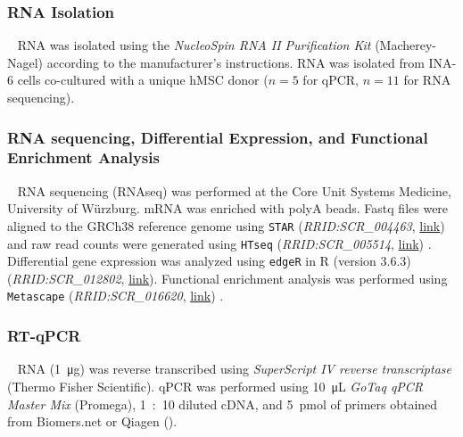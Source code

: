 \subsubsection*{RNA Isolation}
\ %
RNA was isolated using the \textit{NucleoSpin RNA II Purification Kit}
(Macherey-Nagel) according to the manufacturer's instructions. RNA was isolated
from INA-6 cells co-cultured with a unique hMSC donor ($n=5$ for qPCR, $n=11$
for RNA sequencing).

\subsubsection*{RNA sequencing, Differential Expression, and Functional Enrichment Analysis}
\ %
RNA sequencing (RNAseq) was performed at the Core Unit Systems Medicine,
University of Würzburg. mRNA was enriched with polyA beads. Fastq files were
aligned to the GRCh38 reference genome using \texttt{STAR}
(\textit{RRID:SCR\_004463},
\href{https://scicrunch.org/resolver/RRID:SCR_004463}{link}) and raw read
counts were generated using \texttt{HTseq} (\textit{RRID:SCR\_005514},
\href{https://scicrunch.org/resolver/SCR_005514}{link})
\cite{andersHTSeqPythonFramework2015,dobinSTARUltrafastUniversal2013,zerbinoEnsembl20182018}.
Differential gene expression was analyzed using \texttt{edgeR} in R (version
3.6.3) (\textit{RRID:SCR\_012802},
\href{https://scicrunch.org/resolver/SCR_012802}{link}). Functional
enrichment analysis was performed using \texttt{Metascape}
(\textit{RRID:SCR\_016620},
\href{https://scicrunch.org/resolver/SCR_016620}{link})
\cite{zhouMetascapeProvidesBiologistoriented2019}.


\subsubsection*{RT-qPCR}
\ %
RNA (\SI{1}{\micro\gram}) was reverse transcribed using \textit{SuperScript IV
reverse transcriptase} (Thermo Fisher Scientific). qPCR was performed using
\SI{10}{\micro\liter} \textit{GoTaq qPCR Master Mix} (Promega), \SI{1}{:10}
diluted cDNA, and \SI{5}{pmol} of primers obtained from Biomers.net or Qiagen
().


